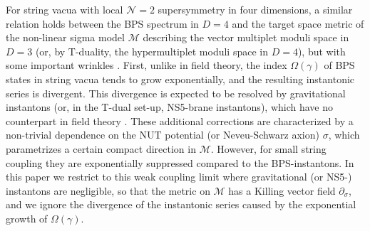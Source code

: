 \documentclass[12pt,reqno]{article}
\numberwithin{equation}{section}
\newcommand{\cM}{\mathcal{M}}
\newcommand{\cN}{\mathcal{N}}
\numberwithin{equation}{section}
\begin{document}
For string vacua with local $\cN=2$ supersymmetry in four dimensions, a similar
relation holds between the BPS spectrum in $D=4$ and the target space metric of the
non-linear sigma model $\cM$  describing the vector multiplet moduli space
in $D=3$ (or, by T-duality, the hypermultiplet moduli space in $D=4$),
but with some important wrinkles \cite{Alexandrov:2008gh}. First,  unlike in field theory,
the index $\Omega(\gamma)$ of BPS states in string vacua tends to grow exponentially, and the resulting
instantonic series is divergent. This divergence is expected to be resolved by
gravitational instantons (or, in the T-dual set-up, NS5-brane instantons), which
have no counterpart in field theory \cite{Pioline:2009ia}.
These additional corrections are characterized by a non-trivial
dependence on the NUT potential (or Neveu-Schwarz axion)
$\sigma$, which parametrizes a certain compact
direction in $\cM$. However, for small string coupling
they are exponentially suppressed compared to the BPS-instantons.
In this paper we restrict to this weak coupling limit where gravitational (or NS5-) instantons are negligible,
so that the metric on $\cM$ has a Killing vector field $\partial_\sigma$, and we
ignore the divergence of the instantonic series caused by the exponential growth of $\Omega(\gamma)$.
\end{document}
